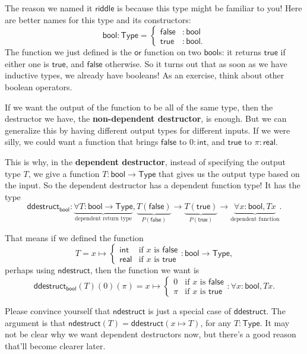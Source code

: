 \documentclass[11pt,paper=letter]{scrartcl}
\renewcommand{\sf}{\mathsf}
\newcommand{\type}{\mathsf{Type}}
\begin{document}
The reason we named it $\sf{riddle}$ is because this type might be familiar to you! Here are better names for this type and its constructors: \[
  \sf{bool} : \type = \begin{cases}
    \sf{false}&: \sf{bool} \\
    \sf{true}&: \sf{bool}.
  \end{cases}
\]
The function we just defined is the $\sf{or}$ function on two $\sf{bool}$s: it returns $\sf{true}$ if either one is $\sf{true}$, and $\sf{false}$ otherwise. So it turns out that as soon as we have inductive types, we already have booleans! As an exercise, think about other boolean operators.

If we want the output of the function to be all of the same type, then the destructor we have, the \textbf{non-dependent destructor}, is enough. But we can generalize this by having different output types for different inputs. If we were silly, we could want a function that brings $\sf{false}$ to $0 : \sf{int}$, and $\sf{true}$ to $\pi : \sf{real}$.

This is why, in the \textbf{dependent destructor}, instead of specifying the output type $T$, we give a function $T: \sf{bool} \to \type$ that gives us the output type based on the input. So the dependent destructor has a dependent function type! It has the type \[
  \sf{ddestruct}_\sf{bool}:
  \underbrace{\forall T: \sf{bool} \to \type}_{\text{dependent return type}},
  \underbrace{T(\sf{false})}_{P(\sf{false})} \to
  \underbrace{T(\sf{true})}_{P(\sf{true})} \to
  \underbrace{\forall x: \sf{bool}, Tx}_{\text{dependent function}}.
\]

That means if we defined the function \[
  T = x \mapsto \begin{cases}
    \sf{int} & \text{if $x$ is }\sf{false}\\
    \sf{real} & \text{if $x$ is }\sf{true}
  \end{cases} : \sf{bool} \to \type,
\]
perhaps using $\sf{ndestruct}$, then the function we want is \[
  \sf{ddestruct}_\sf{bool}(T)(0)(\pi) = x \mapsto \begin{cases}
    0 & \text{if $x$ is }\sf{false}\\
    \pi & \text{if $x$ is }\sf{true}
  \end{cases} : \forall x: \sf{bool}, Tx.
\]

Please convince yourself that $\sf{ndestruct}$ is just a special case of $\sf{ddestruct}$. The argument is that $\sf{ndestruct}(T) = \sf{ddestruct}(x \mapsto T)$, for any $T : \type$. It may not be clear why we want dependent destructors now, but there's a good reason that'll become clearer later.
\end{document}
